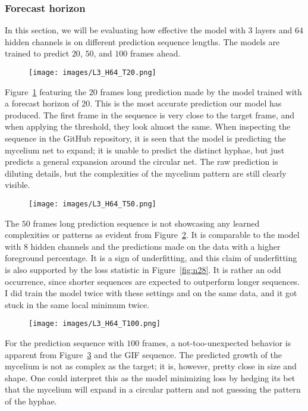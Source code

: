 \documentclass[a4paper,12pt]{article}
\begin{document}
\subsubsection{Forecast horizon}
In this section, we will be evaluating how effective the model with $3 $ layers and $64$ hidden channels is on different prediction sequence lengths. The models are trained to predict $20$, $50$, and $100$ frames ahead.
\begin{figure}[H]
\centering
\texttt{[image: images/L3\_H64\_T20.png]}
\caption{} %
\label{fig:n25}
\end{figure}
Figure~\ref{fig:n25} featuring the $20$ frames long prediction made by the model trained with a forecast horizon of $20$. This is the most accurate prediction our model has produced. The first frame in the sequence is very close to the target frame, and when applying the threshold, they look almost the same.
When inspecting the sequence in the GitHub repository, it is seen that the model is predicting the mycelium net to expand; it is unable to predict the distinct hyphae, but just predicts a general expansion around the circular net. The raw prediction is diluting details, but the complexities of the mycelium pattern are still clearly visible.
\begin{figure}[H]
\centering
\texttt{[image: images/L3\_H64\_T50.png]}
\caption{} %
\label{fig:n26}
\end{figure}
The $50$ frames long prediction sequence is not showcasing any learned complexities or patterns as evident from Figure~\ref{fig:n26}. It is comparable to the model with $8$ hidden channels and the predictions made on the data with a higher foreground percentage. It is a sign of underfitting, and this claim of underfitting is also supported by the loss statistic in Figure~\ref{fig:n28}. It is rather an odd occurrence, since shorter sequences are expected to outperform longer sequences. I did train the model twice with these settings and on the same data, and it got stuck in the same local minimum twice.
\begin{figure}[H]
\centering
\texttt{[image: images/L3\_H64\_T100.png]}
\caption{} %
\label{fig:n27}
\end{figure}
For the prediction sequence with $100$ frames, a not-too-unexpected behavior is apparent from Figure~\ref{fig:n27} and the GIF sequence. The predicted growth of the mycelium is not as complex as the target; it is, however, pretty close in size and shape. One could interpret this as the model minimizing loss by hedging its bet that the mycelium will expand in a circular pattern and not guessing the pattern of the hyphae.
\end{document}
